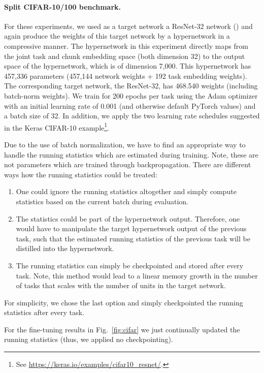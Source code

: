\documentclass{article}
\begin{document}
\paragraph{Split CIFAR-10/100 benchmark.}

For these experiments, we used as a target network a ResNet-32 network (\cite{resnet}) and again produce the weights of this target network by a hypernetwork in a compressive manner. The hypernetwork in this experiment directly maps from the joint task and chunk embedding space (both dimension 32) to the output space of the hypernetwork, which is of dimension 7,000. This hypernetwork has 457,336 parameters (457,144 network weights + 192 task embedding weights). The corresponding target network, the ResNet-32, has 468.540 weights (including batch-norm weights). We train for 200 epochs per task using the Adam optimizer with an initial learning rate of 0.001 (and otherwise default PyTorch values) and a batch size of 32. In addition, we apply the two learning rate schedules suggested in the Keras CIFAR-10 example\footnote{See \url{https://keras.io/examples/cifar10_resnet/}.}.

Due to the use of batch normalization, we have to find an appropriate way to handle the running statistics which are estimated during training. Note, these are not parameters which are trained through backpropagation. There are different ways how the running statistics could be treated:

\begin{enumerate}
    \item One could ignore the running statistics altogether and simply compute statistics based on the current batch during evaluation.
    \item The statistics could be part of the hypernetwork output. Therefore, one would have to manipulate the target hypernetwork output of the previous task, such that the estimated running statistics of the previous task will be distilled into the hypernetwork.
    \item The running statistics can simply be checkpointed and stored after every task. Note, this method would lead to a linear memory growth in the number of tasks that scales with the number of units in the target network.
\end{enumerate}

For simplicity, we chose the last option and simply checkpointed the running statistics after every task.

For the fine-tuning results in Fig.~\ref{fig:cifar} we just continually updated the running statistics (thus, we applied no checkpointing).
\end{document}
